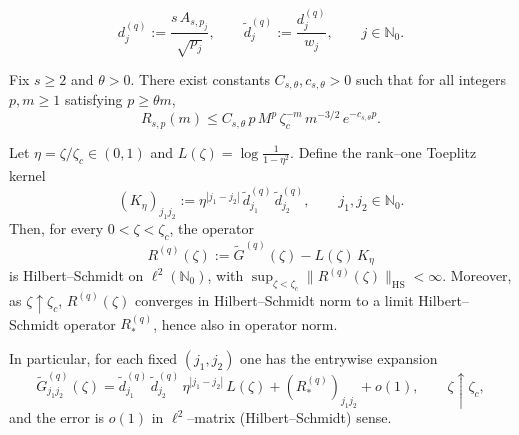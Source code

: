 \documentclass[10pt,a4paper]{amsart}
\newcommand{\NN}{\mathbb{N}}
\begin{document}
\begin{equation}\label{eq:app-d-def}
	d^{(q)}_j:=\frac{s\,A_{s,p_j}}{\sqrt{p_j}},\qquad \widetilde d^{(q)}_j:=\frac{d^{(q)}_j}{w_j},
	\qquad j\in\NN_0.
\end{equation}

\begin{lemma}\label{lem:raney-gap}
	Fix $s\ge2$ and $\theta>0$.  There exist constants $C_{s,\theta},c_{s,\theta}>0$
	such that for all integers $p,m\ge1$ satisfying $p\ge\theta m$,
	\[
		R_{s,p}(m)
		\le
		C_{s,\theta}\,p\,M^{p}\,\zeta_c^{-m}\,m^{-3/2}\,e^{-c_{s,\theta}p}.
	\]
\end{lemma}

\begin{lemma}\label{lem:entrywise-log}
	Let $\eta=\zeta/\zeta_c\in(0,1)$ and $L(\zeta)=\log\frac{1}{1 - \eta^2}$.
	Define the rank--one Toeplitz kernel
	\[
		(K_\eta)_{j_1j_2}:=\eta^{|j_1-j_2|}\,\widetilde d^{(q)}_{j_1}\,\widetilde d^{(q)}_{j_2},
		\qquad j_1,j_2\in\NN_0.
	\]
	Then, for every $0<\zeta<\zeta_c$, the operator
	\[
	R^{(q)}(\zeta):=\widetilde G^{(q)}(\zeta)-L(\zeta)\,K_\eta
	\]
	is Hilbert--Schmidt on $\ell^2(\NN_0)$, with $\sup_{\zeta<\zeta_c}\|R^{(q)}(\zeta)\|_{\mathrm{HS}}<\infty$.
 Moreover, as $\zeta\uparrow\zeta_c$, $R^{(q)}(\zeta)$ converges in Hilbert--Schmidt norm
 to a limit Hilbert--Schmidt operator $R_*^{(q)}$, hence also in operator norm.

	In particular, for each fixed $(j_1,j_2)$ one has the entrywise expansion
	\begin{equation}\label{eq:app-entrywise-log}
		\widetilde G^{(q)}_{j_1j_2}(\zeta)
		=
		\widetilde d^{(q)}_{j_1}\,\widetilde d^{(q)}_{j_2}\,\eta^{|j_1-j_2|}\,L(\zeta)
		+(R_*^{(q)})_{j_1j_2}
		+o(1),
		\qquad \zeta\uparrow\zeta_c,
	\end{equation}
	and the error is $o(1)$ in $\ell^2$--matrix (Hilbert--Schmidt) sense.
\end{lemma}
\end{document}
